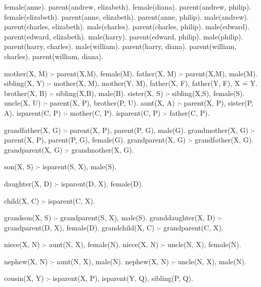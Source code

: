 
female(anne).		parent(andrew, elizabeth).
female(diana).		parent(andrew, philip).
female(elizabeth).	parent(anne, elizabeth).
			parent(anne, philip).
male(andrew).		parent(charles, elizabeth).
male(charles).		parent(charles, philip).
male(edward).		parent(edward, elizabeth).
male(harry).		parent(edward, philip).
male(philip).		parent(harry, charles).
male(william).		parent(harry, diana).
			parent(william, charles).
			parent(william, diana).

mother(X, M) :- parent(X,M), female(M).
father(X, M) :- parent(X,M), male(M).
sibling(X, Y) :- mother(X, M), mother(Y, M), father(X, F), father(Y, F), X \== Y.
brother(X, B) :- sibling(X,B), male(B).
sister(X, S) :- sibling(X,S), female(S).
uncle(X, U) :- parent(X, P), brother(P, U).
aunt(X, A) :- parent(X, P), sister(P, A).
isparent(C, P) :- mother(C, P).
isparent(C, P) :- father(C, P).


grandfather(X, G) :- parent(X, P), parent(P, G), male(G).
grandmother(X, G) :- parent(X, P), parent(P, G), female(G).
grandparent(X, G) :- grandfather(X, G).
grandparent(X, G) :- grandmother(X, G).

son(X, S) :- isparent(S, X), male(S).

daughter(X, D) :- isparent(D, X), female(D).

child(X, C) :- isparent(C, X).

grandson(X, S) :- grandparent(S, X), male(S).
granddaughter(X, D) :- grandparent(D, X), female(D).
grandchild(X, C) :- grandparent(C, X).

niece(X, N) :- aunt(N, X), female(N).
niece(X, N) :- uncle(N, X), female(N).

nephew(X, N) :- aunt(N, X), male(N).
nephew(X, N) :- uncle(N, X), male(N).

cousin(X, Y) :- isparent(X, P), isparent(Y, Q), sibling(P, Q).